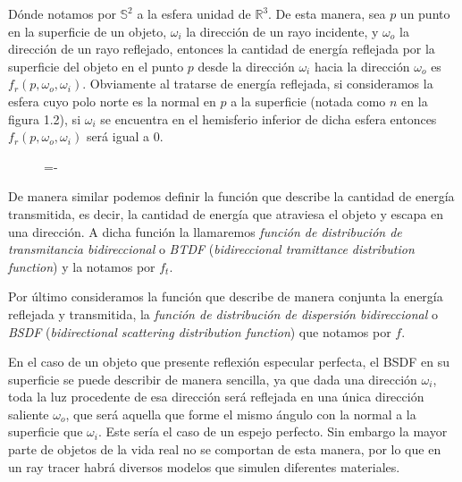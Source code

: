 Dónde notamos por $\mathds{S}^2$ a la esfera unidad de $\mathds{R}^3$. De esta manera, sea $p$ un punto en la superficie de un objeto, $\omega _i$ la dirección de un rayo incidente, y $\omega _o$ la dirección de un rayo reflejado, entonces la cantidad de energía reflejada por la superficie del objeto en el punto $p$ desde la dirección $\omega _i$ hacia la dirección $\omega _o$ es $f_r(p,\omega _o, \omega _i)$. Obviamente al tratarse de energía reflejada, si consideramos la esfera cuyo polo norte es la normal en $p$ a la superficie (notada como $n$ en la figura 1.2), si $\omega _i$ se encuentra en el hemisferio inferior de dicha esfera entonces $f_r(p,\omega _o, \omega _i)$ será igual a 0.\\

\begin{figure}[h]
  \lineskip=-\fboxrule
\end{figure}

De manera similar podemos definir la función que describe la cantidad de energía transmitida, es decir, la cantidad de energía que atraviesa el objeto y escapa en una dirección. A dicha función la llamaremos \emph{función de distribución de transmitancia bidireccional} o \emph{BTDF} (\emph{bidireccional tramittance distribution function}) y la notamos por $f_t$.

Por último consideramos la función que describe de manera conjunta la energía reflejada y transmitida, la \emph{función de distribución de dispersión bidireccional} o \emph{BSDF} (\emph{bidirectional scattering distribution function}) que notamos por $f$.

En el caso de un objeto que presente reflexión especular perfecta, el BSDF en su superficie se puede describir de manera sencilla, ya que dada una dirección $\omega _i$, toda la luz procedente de esa dirección será reflejada en una única dirección saliente $\omega _o$, que será aquella que forme el mismo ángulo con la normal a la superficie que $\omega _i$. Este sería el caso de un espejo perfecto. Sin embargo la mayor parte de objetos de la vida real no se comportan de esta manera, por lo que en un ray tracer habrá diversos modelos que simulen diferentes materiales.

